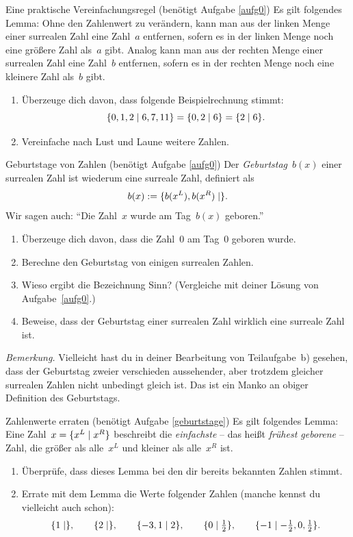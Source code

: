 \documentclass{zirkelblatt}
\begin{document}
\begin{aufgabe}{Eine praktische Vereinfachungsregel (benötigt Aufgabe \ref{aufg0})}
\label{vereinfachungsregel}
Es gilt folgendes Lemma: Ohne den Zahlenwert zu verändern, kann man aus der
linken Menge einer surrealen Zahl eine Zahl~$a$ entfernen, sofern es in der
linken Menge noch eine größere Zahl als~$a$ gibt. Analog kann man aus der
rechten Menge einer surrealen Zahl eine Zahl~$b$ entfernen, sofern es in der
rechten Menge noch eine kleinere Zahl als~$b$ gibt.
\begin{enumerate}
\item Überzeuge dich davon, dass folgende Beispielrechnung stimmt:
\[ \{ 0,1,2 \mathrel{|} 6,7,11 \} = \{ 0,2 \mathrel{|} 6 \} = \{ 2 \mathrel{|} 6 \}. \]
\item Vereinfache nach Lust und Laune weitere Zahlen.
\end{enumerate}
\end{aufgabe}

\begin{aufgabe}{Geburtstage von Zahlen (benötigt Aufgabe \ref{aufg0})}
\label{geburtstage}
Der \emph{Geburtstag}~$b(x)$ einer surrealen Zahl ist wiederum eine surreale
Zahl, definiert als
\[ b(x) := \{ b(x^L), b(x^R) \mathrel{|}  \}. \]
Wir sagen auch: "`Die Zahl~$x$ wurde am Tag~$b(x)$ geboren."'
\begin{enumerate}
\item Überzeuge dich davon, dass die Zahl~$0$ am Tag~$0$ geboren wurde.
\item Berechne den Geburtstag von einigen surrealen Zahlen.
\item Wieso ergibt die Bezeichnung Sinn? (Vergleiche mit deiner Lösung von
Aufgabe~\ref{aufg0}.)
\item Beweise, dass der Geburtstag einer surrealen Zahl wirklich eine surreale
Zahl ist.
\end{enumerate}
\emph{Bemerkung.} Vielleicht hast du in deiner Bearbeitung von Teilaufgabe~b)
gesehen, dass der Geburtstag zweier verschieden aussehender, aber trotzdem
gleicher surrealen Zahlen nicht unbedingt gleich ist. Das ist ein Manko an obiger
Definition des Geburtstags.
\end{aufgabe}

\begin{aufgabe}{Zahlenwerte erraten (benötigt Aufgabe \ref{geburtstage})}
\label{zahlenraten}
Es gilt folgendes Lemma: Eine Zahl~$x = \{ x^L \mathrel{|} x^R \}$ beschreibt die
\emph{einfachste} -- das heißt \emph{frühest geborene} -- Zahl, die größer als
alle~$x^L$ und kleiner als alle~$x^R$ ist.

\begin{enumerate}
\item Überprüfe, dass dieses Lemma bei den dir bereits bekannten Zahlen stimmt.
\item Errate mit dem Lemma die Werte folgender Zahlen (manche kennst du
vielleicht auch schon):
\[ \{ 1 \mathrel{|}  \}, \qquad
  \{ 2 \mathrel{|}  \}, \qquad
  \{ -3,1 \mathrel{|} 2 \}, \qquad
  \{ 0 \mathrel{|} \tfrac{1}{2} \}, \qquad
  \{ -1 \mathrel{|} -\tfrac{1}{2},0,\tfrac{1}{2} \}. \]
\end{enumerate}
\end{aufgabe}
\end{document}
